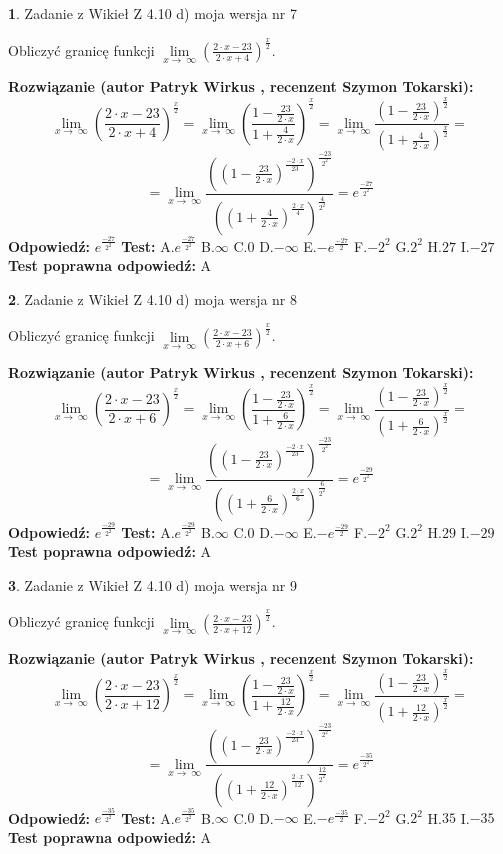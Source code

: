 \documentclass[12pt, a4paper]{article}
\theoremstyle{definition} %
\newtheorem{zad}{}
\newcommand{\zadStart}[1]{\begin{zad}#1\newline}
\newcommand{\zadStop}{\end{zad}}
\newcommand{\rozwStart}[2]{\noindent \textbf{Rozwiązanie (autor #1 , recenzent #2): }\newline}
\newcommand{\rozwStop}{\newline}
\newcommand{\odpStart}{\noindent \textbf{Odpowiedź:}\newline}
\newcommand{\odpStop}{\newline}
\newcommand{\testStart}{\noindent \textbf{Test:}\newline}
\newcommand{\testStop}{\newline}
\newcommand{\kluczStart}{\noindent \textbf{Test poprawna odpowiedź:}\newline}
\newcommand{\kluczStop}{\newline}
\begin{document}
\zadStart{Zadanie z Wikieł Z 4.10 d) moja wersja nr 7}


Obliczyć granicę funkcji  $\lim\limits_{x\to\ \infty}(\frac{2\cdot x-23}{2\cdot x+4})^{\frac{x}{2}}$.
\zadStop
\rozwStart{Patryk Wirkus}{Szymon Tokarski}
$$\lim\limits_{x\to\ \infty}(\frac{2\cdot x-23}{2\cdot x+4})^{\frac{x}{2}} = \lim\limits_{x\to\ \infty}(\frac{1-\frac{23}{2\cdot x}}{1+\frac{4}{2\cdot x}})^{\frac{x}{2}}=\lim\limits_{x\to\ \infty}\frac{(1-\frac{23}{2\cdot x})^{\frac{x}{2}}}{(1+\frac{4}{2\cdot x})^{\frac{x}{2}}}=$$
$$=\lim\limits_{x\to\ \infty}\frac{((1-\frac{23}{2\cdot x})^{\frac{-2\cdot x}{23}})^{\frac{-23}{2^{2}}}}{((1+\frac{4}{2\cdot x})^{\frac{2\cdot x}{4}})^{\frac{4}{2^{2}}}}=e^{\frac{-27}{2^{2}}}$$
\rozwStop
\odpStart
$e^{\frac{-27}{2^{2}}}$
\odpStop
\testStart
A.$e^{\frac{-27}{2^{2}}}$ B.$\infty$ C.$0$ D.$-\infty$ E.$-e^{\frac{-27}{2}}$
F.$-2^{2}$ G.$2^{2}$
H.$27$
I.$-27$
\testStop
\kluczStart
A
\kluczStop



\zadStart{Zadanie z Wikieł Z 4.10 d) moja wersja nr 8}


Obliczyć granicę funkcji  $\lim\limits_{x\to\ \infty}(\frac{2\cdot x-23}{2\cdot x+6})^{\frac{x}{2}}$.
\zadStop
\rozwStart{Patryk Wirkus}{Szymon Tokarski}
$$\lim\limits_{x\to\ \infty}(\frac{2\cdot x-23}{2\cdot x+6})^{\frac{x}{2}} = \lim\limits_{x\to\ \infty}(\frac{1-\frac{23}{2\cdot x}}{1+\frac{6}{2\cdot x}})^{\frac{x}{2}}=\lim\limits_{x\to\ \infty}\frac{(1-\frac{23}{2\cdot x})^{\frac{x}{2}}}{(1+\frac{6}{2\cdot x})^{\frac{x}{2}}}=$$
$$=\lim\limits_{x\to\ \infty}\frac{((1-\frac{23}{2\cdot x})^{\frac{-2\cdot x}{23}})^{\frac{-23}{2^{2}}}}{((1+\frac{6}{2\cdot x})^{\frac{2\cdot x}{6}})^{\frac{6}{2^{2}}}}=e^{\frac{-29}{2^{2}}}$$
\rozwStop
\odpStart
$e^{\frac{-29}{2^{2}}}$
\odpStop
\testStart
A.$e^{\frac{-29}{2^{2}}}$ B.$\infty$ C.$0$ D.$-\infty$ E.$-e^{\frac{-29}{2}}$
F.$-2^{2}$ G.$2^{2}$
H.$29$
I.$-29$
\testStop
\kluczStart
A
\kluczStop



\zadStart{Zadanie z Wikieł Z 4.10 d) moja wersja nr 9}


Obliczyć granicę funkcji  $\lim\limits_{x\to\ \infty}(\frac{2\cdot x-23}{2\cdot x+12})^{\frac{x}{2}}$.
\zadStop
\rozwStart{Patryk Wirkus}{Szymon Tokarski}
$$\lim\limits_{x\to\ \infty}(\frac{2\cdot x-23}{2\cdot x+12})^{\frac{x}{2}} = \lim\limits_{x\to\ \infty}(\frac{1-\frac{23}{2\cdot x}}{1+\frac{12}{2\cdot x}})^{\frac{x}{2}}=\lim\limits_{x\to\ \infty}\frac{(1-\frac{23}{2\cdot x})^{\frac{x}{2}}}{(1+\frac{12}{2\cdot x})^{\frac{x}{2}}}=$$
$$=\lim\limits_{x\to\ \infty}\frac{((1-\frac{23}{2\cdot x})^{\frac{-2\cdot x}{23}})^{\frac{-23}{2^{2}}}}{((1+\frac{12}{2\cdot x})^{\frac{2\cdot x}{12}})^{\frac{12}{2^{2}}}}=e^{\frac{-35}{2^{2}}}$$
\rozwStop
\odpStart
$e^{\frac{-35}{2^{2}}}$
\odpStop
\testStart
A.$e^{\frac{-35}{2^{2}}}$ B.$\infty$ C.$0$ D.$-\infty$ E.$-e^{\frac{-35}{2}}$
F.$-2^{2}$ G.$2^{2}$
H.$35$
I.$-35$
\testStop
\kluczStart
A
\kluczStop
\end{document}
